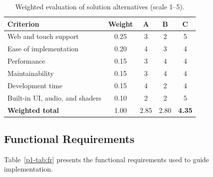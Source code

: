 \documentclass[conference]{IEEEtran}
\begin{document}
\begin{table}[t]
\caption{Weighted evaluation of solution alternatives (scale 1--5).}
\label{p1-tab:eval}
\centering
\small
\begin{tabular}{p{3.15cm}cccc}
\toprule
\textbf{Criterion} & \textbf{Weight} & \textbf{A} & \textbf{B} & \textbf{C}\\
\midrule
Web and touch support & 0.25 & 3 & 2 & 5\\
Ease of implementation & 0.20 & 4 & 3 & 4\\
Performance & 0.15 & 3 & 4 & 4\\
Maintainability & 0.15 & 3 & 4 & 4\\
Development time & 0.15 & 4 & 2 & 4\\
Built-in UI, audio, and shaders & 0.10 & 2 & 2 & 5\\
\midrule
\textbf{Weighted total} & 1.00 & 2.85 & 2.80 & \textbf{4.35}\\
\bottomrule
\end{tabular}
\end{table}

\subsection{Functional Requirements}
Table~\ref{p1-tab:fr} presents the functional requirements used to guide implementation.
\end{document}

